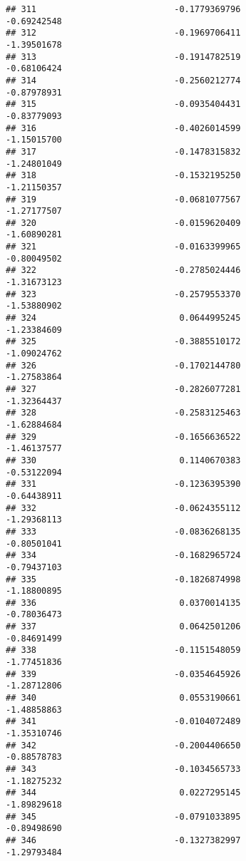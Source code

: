 \documentclass[
]{article}
\begin{document}
\begin{verbatim}
## 311                           -0.1779369796                -0.69242548
## 312                           -0.1969706411                -1.39501678
## 313                           -0.1914782519                -0.68106424
## 314                           -0.2560212774                -0.87978931
## 315                           -0.0935404431                -0.83779093
## 316                           -0.4026014599                -1.15015700
## 317                           -0.1478315832                -1.24801049
## 318                           -0.1532195250                -1.21150357
## 319                           -0.0681077567                -1.27177507
## 320                           -0.0159620409                -1.60890281
## 321                           -0.0163399965                -0.80049502
## 322                           -0.2785024446                -1.31673123
## 323                           -0.2579553370                -1.53880902
## 324                            0.0644995245                -1.23384609
## 325                           -0.3885510172                -1.09024762
## 326                           -0.1702144780                -1.27583864
## 327                           -0.2826077281                -1.32364437
## 328                           -0.2583125463                -1.62884684
## 329                           -0.1656636522                -1.46137577
## 330                            0.1140670383                -0.53122094
## 331                           -0.1236395390                -0.64438911
## 332                           -0.0624355112                -1.29368113
## 333                           -0.0836268135                -0.80501041
## 334                           -0.1682965724                -0.79437103
## 335                           -0.1826874998                -1.18800895
## 336                            0.0370014135                -0.78036473
## 337                            0.0642501206                -0.84691499
## 338                           -0.1151548059                -1.77451836
## 339                           -0.0354645926                -1.28712806
## 340                            0.0553190661                -1.48858863
## 341                           -0.0104072489                -1.35310746
## 342                           -0.2004406650                -0.88578783
## 343                           -0.1034565733                -1.18275232
## 344                            0.0227295145                -1.89829618
## 345                           -0.0791033895                -0.89498690
## 346                           -0.1327382997                -1.29793484

\end{verbatim}
\end{document}
